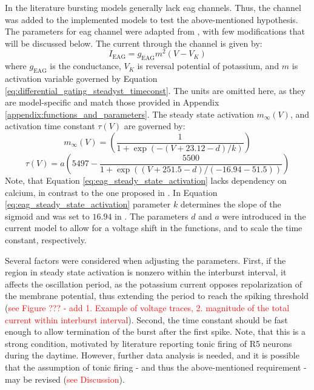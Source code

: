 \documentclass[../main.tex]{subfiles}
\begin{document}
In the literature bursting models generally lack \gls{eag} channels. Thus, the channel was added to the implemented models to test the above-mentioned hypothesis. The parameters for \gls{eag} channel were adapted from \parencite{bronkRegulationEagCa22018}, with few modifications that will be discussed below. The current through the channel is given by:
\begin{equation*}
    I_{\text{EAG}} = g_{\text{EAG}} m^2 (V - V_K)
\end{equation*}
where $g_{\text{EAG}}$ is the conductance, $V_K$ is reversal potential of potassium, and $m$ is activation variable governed by Equation \ref{eq:differential_gating_steadyst_timeconst}. The units are omitted here, as they are model-specific and match those provided in Appendix \ref{appendix:functions_and_parameters}. The steady state activation $m_{\infty}(V)$, and activation time constant $\tau(V)$ are governed by:
\begin{equation}\label{eq:eag_steady_state_activation}
    m_\infty(V) = \left( \frac{1}{1 + \exp{(-(V+23.12-d)/k)}} \right)
\end{equation}
\begin{equation} \label{eq:eag_tau_activation}
    \tau(V) = a\left(5497 - \frac{5500}{1 + \exp( (V + 251.5 - d) / (-16.94-51.5) ) }\right)
\end{equation}
Note, that Equation \ref{eq:eag_steady_state_activation} lacks dependency on calcium, in contrast to the one proposed in \parencite{bronkRegulationEagCa22018}. In Equation \ref{eq:eag_steady_state_activation} parameter $k$ determines the slope of the sigmoid and was set to $16.94$ in \parencite{bronkRegulationEagCa22018}. The parameters $d$ and $a$ were introduced in the current model to allow for a voltage shift in the functions, and to scale the time constant, respectively.

Several factors were considered when adjusting the parameters. First, if the region in steady state activation is nonzero within the interburst interval, it affects the oscillation period, as the potassium current opposes repolarization of the membrane potential, thus extending the period to reach the spiking threshold (\textcolor{red}{see Figure ??? - add 1. Example of voltage traces, 2. magnitude of the total current within interburst interval}). Second, the time constant should be fast enough to allow termination of the burst after the first spike. Note, that this is a strong condition, motivated by literature reporting tonic firing of R5 neurons during the daytime.  However, further data analysis is needed, and it is possible that the assumption of tonic firing - and thus the above-mentioned requirement - may be revised (\textcolor{red}{see Discussion}).
\end{document}
